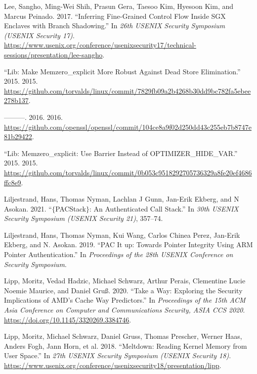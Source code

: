 \documentclass[
  a4paper,
]{report}
\newlength{\cslhangindent}
\newenvironment{CSLReferences}[2] %
{\begin{list}{}{%
	\setlength{\itemindent}{0pt}
	\setlength{\leftmargin}{0pt}
	\setlength{\parsep}{0pt}
	\ifodd #1
	\setlength{\leftmargin}{\cslhangindent}
	\setlength{\itemindent}{-1\cslhangindent}
	\fi
	\setlength{\itemsep}{#2\baselineskip}}}
{\end{list}}
\begin{document}
\begin{CSLReferences}{1}{0}
Lee, Sangho, Ming-Wei Shih, Prasun Gera, Taesoo Kim, Hyesoon Kim, and
Marcus Peinado. 2017. {``Inferring Fine-Grained Control Flow Inside
{SGX} Enclaves with Branch Shadowing.''} In \emph{26th USENIX Security
Symposium (USENIX Security 17)}.
\url{https://www.usenix.org/conference/usenixsecurity17/technical-sessions/presentation/lee-sangho}.

{``Lib: Make Memzero\_explicit More Robust Against Dead Store
Elimination.''} 2015. 2015.
\url{https://github.com/torvalds/linux/commit/7829fb09a2b4268b30dd9bc782fa5ebee278b137}.

---------. 2016. 2016.
\url{https://github.com/openssl/openssl/commit/104ce8a9f02d250dd43c255eb7b8747e81b29422}.

{``Lib: Memzero\_explicit: Use Barrier Instead of
{OPTIMIZER\_HIDE\_VAR}.''} 2015. 2015.
\url{https://github.com/torvalds/linux/commit/0b053c9518292705736329a8fe20ef4686ffc8e9}.

Liljestrand, Hans, Thomas Nyman, Lachlan J Gunn, Jan-Erik Ekberg, and N
Asokan. 2021. {``\(\{\)PACStack\(\}\): An Authenticated Call Stack.''}
In \emph{30th USENIX Security Symposium (USENIX Security 21)}, 357--74.

Liljestrand, Hans, Thomas Nyman, Kui Wang, Carlos Chinea Perez, Jan-Erik
Ekberg, and N. Asokan. 2019. {``PAC It up: Towards Pointer Integrity
Using ARM Pointer Authentication.''} In \emph{Proceedings of the 28th
USENIX Conference on Security Symposium}.

Lipp, Moritz, Vedad Hadzic, Michael Schwarz, Arthur Perais, Clementine
Lucie Noemie Maurice, and Daniel Gruß. 2020. {``Take a Way: Exploring
the Security Implications of AMD's Cache Way Predictors.''} In
\emph{Proceedings of the 15th ACM Asia Conference on Computer and
Communications Security, ASIA CCS 2020}.
\url{https://doi.org/10.1145/3320269.3384746}.

Lipp, Moritz, Michael Schwarz, Daniel Gruss, Thomas Prescher, Werner
Haas, Anders Fogh, Jann Horn, et al. 2018. {``Meltdown: Reading Kernel
Memory from User Space.''} In \emph{27th USENIX Security Symposium
(USENIX Security 18)}.
\url{https://www.usenix.org/conference/usenixsecurity18/presentation/lipp}.


\end{CSLReferences}
\end{document}
